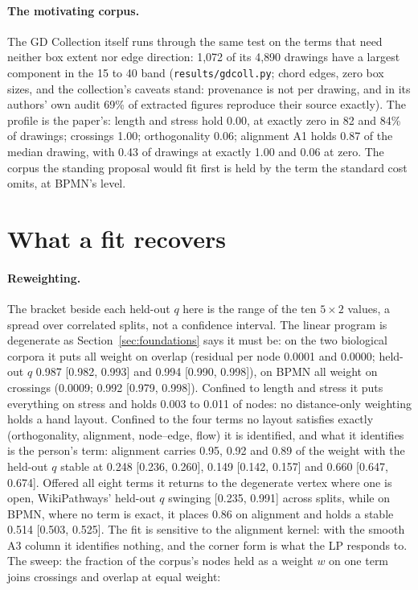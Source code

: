 \documentclass[11pt]{article}
\begin{document}
\paragraph{The motivating corpus.} The GD Collection itself \cite{gdcoll25} runs through
the same test on the terms that need neither box extent nor edge direction: 1{,}072 of
its 4{,}890 drawings have a largest component in the 15 to 40 band
(\texttt{results/gdcoll.py}; chord edges, zero box sizes, and the collection's caveats
stand: provenance is not per drawing, and in its authors' own audit 69\% of extracted
figures reproduce their source exactly). The profile is the paper's: length and stress
hold 0.00, at exactly zero in 82 and 84\% of drawings; crossings 1.00; orthogonality
0.06; alignment A1 holds 0.87 of the median drawing, with 0.43 of drawings at exactly
1.00 and 0.06 at zero. The corpus the standing proposal would fit first is held by the
term the standard cost omits, at BPMN's level.


\section{What a fit recovers}\label{sec:fit}

\paragraph{Reweighting.} The bracket beside each held-out $q$ here is the range of the
ten $5{\times}2$ values, a spread over correlated splits, not a confidence interval. The
linear program is degenerate as Section~\ref{sec:foundations} says it must be: on the two
biological corpora it puts all weight on overlap (residual per node 0.0001 and 0.0000;
held-out $q$ 0.987 [0.982, 0.993] and 0.994 [0.990, 0.998]), on BPMN all weight on
crossings (0.0009; 0.992 [0.979, 0.998]). Confined to length and stress it puts
everything on stress and holds 0.003 to 0.011 of nodes: no distance-only weighting holds
a hand layout. Confined to the four terms no layout satisfies exactly (orthogonality,
alignment, node--edge, flow) it is identified, and what it identifies is the person's
term: alignment carries 0.95, 0.92 and 0.89 of the weight with the held-out $q$ stable at
0.248 [0.236, 0.260], 0.149 [0.142, 0.157] and 0.660 [0.647, 0.674]. Offered all eight
terms it returns to the degenerate vertex where one is open, WikiPathways' held-out $q$
swinging [0.235, 0.991] across splits, while on BPMN, where no term is exact, it places
0.86 on alignment and holds a stable 0.514 [0.503, 0.525]. The fit is sensitive to the alignment
kernel: with the smooth A3 column it identifies nothing, and the corner form is what the
LP responds to. The
sweep: the fraction of the corpus's nodes held as a weight $w$ on one term joins
crossings and overlap at equal weight:
\end{document}
